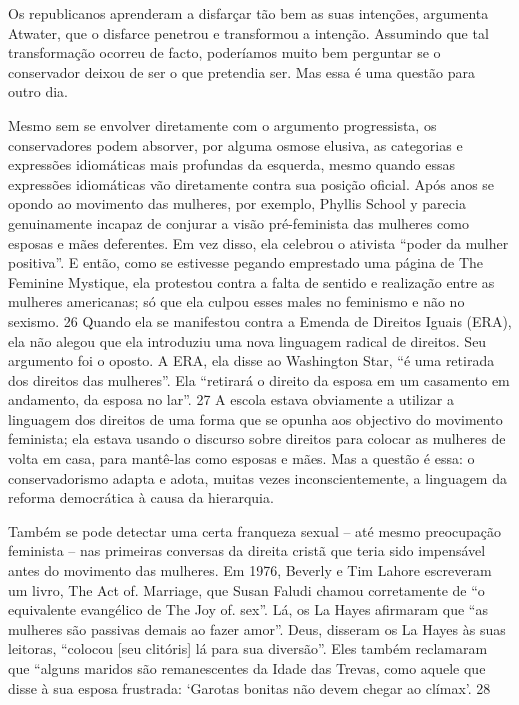  
\par
 
Os republicanos aprenderam a disfarçar tão bem as suas intenções, argumenta Atwater, que o disfarce penetrou e transformou a intenção. Assumindo que tal transformação ocorreu de facto, poderíamos muito bem perguntar se o conservador deixou de ser o que pretendia ser. Mas essa é uma questão para outro dia.
 
\par
 
Mesmo sem se envolver diretamente com o argumento progressista, os conservadores podem absorver, por alguma osmose elusiva, as categorias e expressões idiomáticas mais profundas da esquerda, mesmo quando essas expressões idiomáticas vão diretamente contra sua posição oficial. Após anos se opondo ao movimento das mulheres, por exemplo, Phyllis School y parecia genuinamente incapaz de conjurar a visão pré-feminista das mulheres como esposas e mães deferentes. Em vez disso, ela celebrou o ativista “poder da mulher positiva”. E então, como se estivesse pegando emprestado uma página de The Feminine Mystique, ela protestou contra a falta de sentido e realização entre as mulheres americanas; só que ela culpou esses males no feminismo e não no sexismo.
 {\color{blue} 26}  
Quando ela se manifestou contra a Emenda de Direitos Iguais (ERA), ela não alegou que ela introduziu uma nova linguagem radical de direitos. Seu argumento foi o oposto. A ERA, ela disse ao Washington Star, “é uma retirada dos direitos das mulheres”. Ela “retirará o direito da esposa em um casamento em andamento, da esposa no lar”.
 {\color{blue} 27}  
A escola estava obviamente a utilizar a linguagem dos direitos de uma forma que se opunha aos objectivo do movimento feminista; ela estava usando o discurso sobre direitos para colocar as mulheres de volta em casa, para mantê-las como esposas e mães. Mas a questão é essa: o conservadorismo adapta e adota, muitas vezes inconscientemente, a linguagem da reforma democrática à causa da hierarquia.
 
\par
 
Também se pode detectar uma certa franqueza sexual – até mesmo preocupação feminista – nas primeiras conversas da direita cristã que teria sido impensável antes do movimento das mulheres. Em 1976, Beverly e Tim Lahore escreveram um livro, The Act of. Marriage, que Susan Faludi chamou corretamente de “o equivalente evangélico de The Joy of. sex”. Lá, os La Hayes afirmaram que “as mulheres são passivas demais ao fazer amor”. Deus, disseram os La Hayes às suas leitoras, “colocou [seu clitóris] lá para sua diversão”. Eles também reclamaram que “alguns maridos são remanescentes da Idade das Trevas, como aquele que disse à sua esposa frustrada: ‘Garotas bonitas não devem chegar ao clímax’.
 {\color{blue} 28}  

